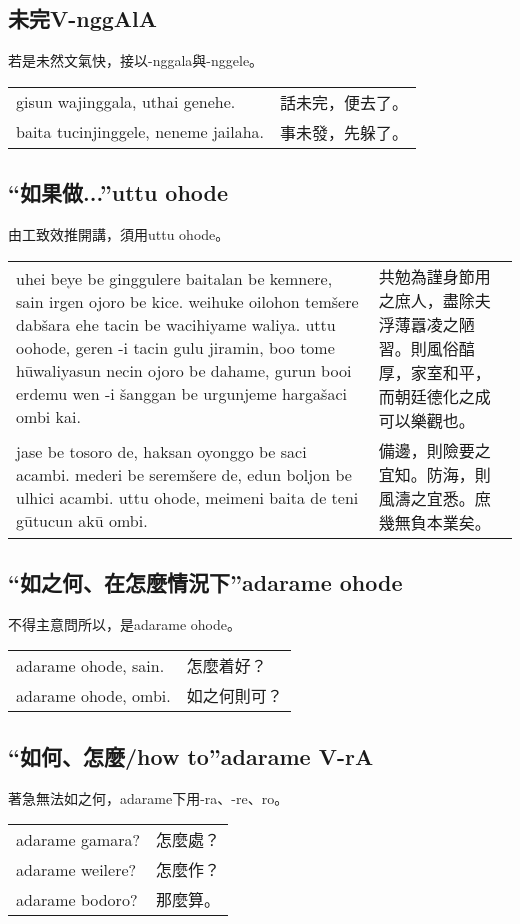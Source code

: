 \documentclass{article}
\begin{document}
\subsection{未完V-nggAlA}
\noindent 若是未然文氣快，接以-nggala與-nggele。
\begin{center}
    \begin{tabularx}{\textwidth}{XX}
        gisun wajinggala, uthai genehe. &話未完，便去了。\\
        baita tucinjinggele, neneme jailaha. &事未發，先躲了。
    \end{tabularx}
\end{center}

\subsection{“如果做...”uttu ohode}
\noindent 由工致效推開講，須用uttu ohode。
\begin{center}
    \begin{tabularx}{\textwidth}{XX}
        uhei beye be ginggulere baitalan be kemnere, sain irgen ojoro be kice. weihuke oilohon tem\v{s}ere dab\v{s}ara ehe tacin be wacihiyame waliya. uttu oohode, geren -i tacin gulu jiramin, boo tome h\={u}waliyasun necin ojoro be dahame, gurun booi erdemu wen -i \v{s}anggan be urgunjeme harga\v{s}aci ombi kai.& 共勉為謹身節用之庶人，盡除夫浮薄囂凌之陋習。則風俗醕厚，家室和平，而朝廷德化之成可以樂觀也。\\
        jase be tosoro de, haksan oyonggo be saci acambi. mederi be serem\v{s}ere de, edun boljon be ulhici acambi. uttu ohode, meimeni baita de teni g\={u}tucun ak\={u} ombi. & 備邊，則險要之宜知。防海，則風濤之宜悉。庶幾無負本業矣。
    \end{tabularx}
\end{center}

\subsection{“如之何、在怎麼情況下”adarame ohode}
\noindent 不得主意問所以，是adarame ohode。
\begin{center}
    \begin{tabularx}{\textwidth}{XX}
        adarame ohode, sain. & 怎麼着好？\\
        adarame ohode, ombi. & 如之何則可？
    \end{tabularx}
\end{center}

\subsection{“如何、怎麼/how to”adarame V-rA}
\noindent 著急無法如之何，adarame下用-ra、-re、ro。
\begin{center}
    \begin{tabularx}{\textwidth}{XX}
        adarame gamara? &怎麼處？\\
        adarame weilere? & 怎麼作？\\
        adarame bodoro? &那麼算。
    \end{tabularx}
\end{center}
\end{document}
